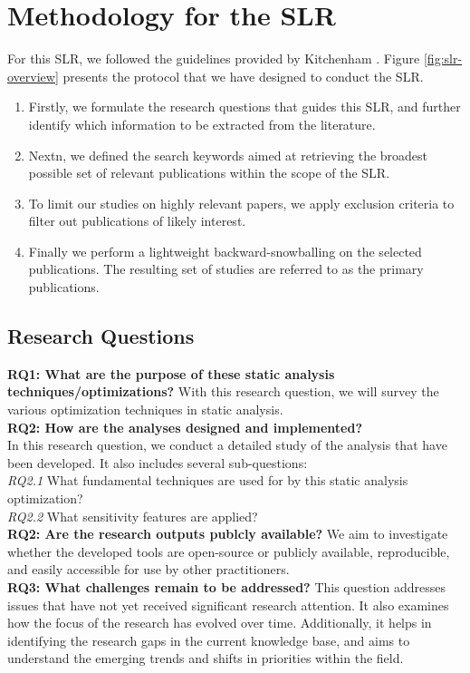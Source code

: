 \section{Methodology for the SLR}
For this SLR, we followed the guidelines provided by Kitchenham \cite{kitchenham2004procedures}. Figure \ref{fig:slr-overview} presents the protocol that we have designed to conduct the SLR.
\begin{enumerate}
    \item Firstly, we formulate the research questions that guides this SLR, and further identify which information to be extracted from the literature.
    \item Nextn, we defined the search keywords aimed at retrieving the broadest possible set of relevant publications within the scope of the SLR.
    \item To limit our studies on highly relevant papers, we apply exclusion criteria to filter out publications of likely interest.
    \item Finally we perform a lightweight backward-snowballing on the selected publications. The resulting set of studies are referred to as the primary publications.
\end{enumerate}


\subsection{Research Questions}

\textbf{RQ1: What are the purpose of these static analysis techniques/optimizations?}
With this research question, we will survey the various optimization techniques in static analysis. \\
\textbf{RQ2: How are the analyses designed and implemented?} \\
In this research question, we conduct a detailed study of the analysis that have been developed. It also includes several sub-questions:\\
\textit{RQ2.1} What fundamental techniques are used for by this static analysis optimization?\\
\textit{RQ2.2} What sensitivity features are applied?\\
\textbf{RQ2: Are the research outputs publcly available?}
We aim to investigate whether the developed tools are open-source or publicly available, reproducible, and easily accessible for use by other practitioners. \\
\textbf{RQ3: What challenges remain to be addressed?}
This question addresses issues that have not yet received significant research attention. It also examines how the focus of the research has evolved over time. 
Additionally, it helps in identifying the research gaps in the current knowledge base, and aims to understand the emerging trends and shifts in priorities within the field.

